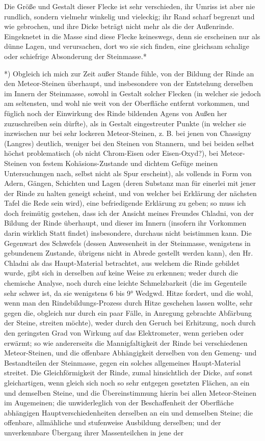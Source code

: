 \documentclass[a4paper, 11pt, oneside, german]{article}
\begin{document}
Die Größe und Gestalt dieser Flecke ist sehr verschieden, ihr Umriss ist aber nie rundlich, sondern vielmehr winkelig und vieleckig; ihr Rand scharf begrenzt und wie gebrochen, und ihre Dicke beträgt nicht mehr als die der Außenrinde. Eingeknetet in die Masse sind diese Flecke keineswegs, denn sie erscheinen nur als dünne Lagen, und verursachen, dort wo sie sich finden, eine gleichsam schalige oder schiefrige Absonderung der Steinmasse.*

*) Obgleich ich mich zur Zeit außer Stande fühle, von der Bildung der Rinde an den Meteor-Steinen überhaupt, und insbesondere von der Entstehung derselben im Innern der Steinmasse, sowohl in Gestalt solcher Flecken (in welcher sie jedoch am seltensten, und wohl nie weit von der Oberfläche entfernt vorkommen, und füglich noch der Einwirkung des Rinde bildenden Agens von Außen her zuzuschreiben sein dürfte), als in Gestalt eingestreuter Punkte (in welcher sie inzwischen nur bei sehr lockeren Meteor-Steinen, z. B. bei jenen von Chassigny (Langres) deutlich, weniger bei den Steinen von Stannern, und bei beiden selbst höchst problematisch (ob nicht Chrom-Eisen oder Eisen-Oxyd?), bei Meteor-Steinen von festem Kohäsions-Zustande und dichtem Gefüge meinen Untersuchungen nach, selbst nicht als Spur erscheint), als vollends in Form von Adern, Gängen, Schichten und Lagen (deren Substanz man für einerlei mit jener der Rinde zu halten geneigt scheint, und von welcher bei Erklärung der nächsten Tafel die Rede sein wird), eine befriedigende Erklärung zu geben; so muss ich doch freimütig gestehen, dass ich der Ansicht meines Freundes Chladni, von der Bildung der Rinde überhaupt, und dieser im Innern (insofern ihr Vorkommen darin wirklich Statt findet) insbesondere, durchaus nicht beistimmen kann. Die Gegenwart des Schwefels (dessen Anwesenheit in der Steinmasse, wenigstens in gebundenem Zustande, übrigens nicht in Abrede gestellt werden kann), den Hr. Chladni als das Haupt-Material betrachtet, aus welchem die Rinde gebildet wurde, gibt sich in derselben auf keine Weise zu erkennen; weder durch die chemische Analyse, noch durch eine leichte Schmelzbarkeit (die im Gegenteile sehr schwer ist, da sie wenigstens 6 bis 9° Wedgwd. Hitze fordert, und die wohl, wenn man den Rindebildungs-Prozess durch Hitze geschehen lassen wollte, sehr gegen die, obgleich nur durch ein paar Fälle, in Anregung gebrachte Abfärbung der Steine, streiten möchte), weder durch den Geruch bei Erhitzung, noch durch den geringsten Grad von Wirkung auf das Elektrometer, wenn gerieben oder erwärmt; so wie andererseits die Mannigfaltigkeit der Rinde bei verschiedenen Meteor-Steinen, und die offenbare Abhängigkeit derselben von den Gemeng- und Bestandteilen der Steinmasse, gegen ein solches allgemeines Haupt-Material streitet. Die Gleichförmigkeit der Rinde, zumal hinsichtlich der Dicke, auf sonst gleichartigen, wenn gleich sich noch so sehr entgegen gesetzten Flächen, an ein und demselben Steine, und die Übereinstimmung hierin bei allen Meteor-Steinen im Augemeinen; die unwiderleglich von der Beschaffenheit der Oberfläche abhängigen Hauptverschiedenheiten derselben an ein und demselben Steine; die offenbare, allmähliche und stufenweise Ausbildung derselben; und der unverkennbare Übergang ihrer Massenteilchen in jene der 
\end{document}
